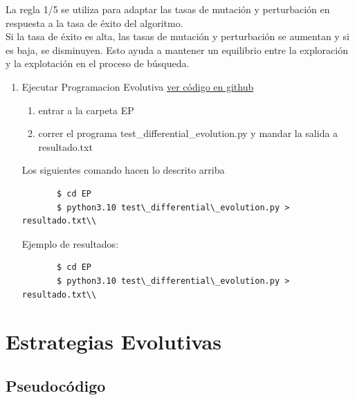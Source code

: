 \documentclass{article}
\begin{document}
La regla 1/5 se utiliza para adaptar las tasas de mutación y perturbación en respuesta a la tasa de éxito del algoritmo. \\Si la tasa de éxito es alta, las tasas de mutación y perturbación se aumentan y si es baja, se disminuyen. Esto ayuda a mantener un equilibrio entre la exploración y la explotación en el proceso de búsqueda.\\

\begin{enumerate} 
\item Ejecutar Programacion Evolutiva
  \href{https://github.com/luisballado/ADA/blob/main/practice_code/tarea1.cpp}{ver código en github}\\
  \begin{enumerate}
  \item entrar a la carpeta EP \\
  \item correr el programa test\_differential\_evolution.py y mandar la salida a resultado.txt\\
  \end{enumerate} 
  
  Los siguientes comando hacen lo descrito arriba
  
  \begin{commandline}
     \begin{verbatim}
       $ cd EP       
       $ python3.10 test\_differential\_evolution.py > resultado.txt\\
     \end{verbatim}
  \end{commandline}
  
  Ejemplo de resultados:

  \begin{commandline}
     \begin{verbatim}
       $ cd EP       
       $ python3.10 test\_differential\_evolution.py > resultado.txt\\
     \end{verbatim}
  \end{commandline}
  
\end{enumerate} 


\newpage
\section{Estrategias Evolutivas}
\subsection{Pseudocódigo}
\end{document}
